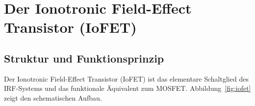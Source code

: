 ﻿\documentclass[a4paper,12pt]{scrreprt}
\theoremstyle{definition}
\begin{document}
\section{Der Ionotronic Field-Effect Transistor (IoFET)}

\subsection{Struktur und Funktionsprinzip}

Der Ionotronic Field-Effect Transistor (IoFET) ist das elementare Schaltglied
des IRF-Systems und das funktionale Äquivalent zum MOSFET. Abbildung~\ref{fig:iofet}
zeigt den schematischen Aufbau.
\end{document}
